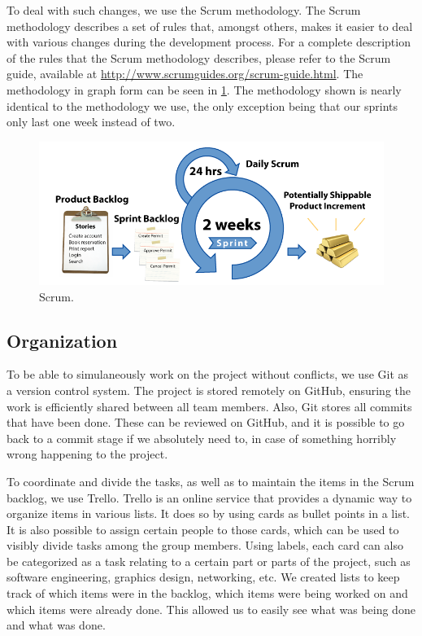 		To deal with such changes, we use the Scrum methodology. The Scrum
		methodology describes a set of rules that, amongst others, makes it
		easier to deal with various changes during the development process.
		For a complete description of the rules that the Scrum methodology
		describes, please refer to the Scrum guide, available at
		\url{http://www.scrumguides.org/scrum-guide.html}. The methodology
		in graph form can be seen in \ref{fig:scrum}. The methodology
		shown is nearly identical to the methodology we use, the only 
		exception being that our sprints only last one week instead of two.
		\begin{figure}
			\centering
			\includegraphics[width=\textwidth]{Scrum}
			\caption{Scrum.}
			\label{fig:scrum}
		\end{figure}

    \subsection{Organization} \label{ssec:organization}
      To be able to simulaneously work on the project without conflicts, we
      use Git as a version control system. The project is stored remotely on
      GitHub, ensuring the work is efficiently shared between all team members.
      Also, Git stores all commits that have been done. These can be reviewed
      on GitHub, and it is possible to go back to a commit stage if we
      absolutely need to, in case of something horribly wrong happening to
      the project.

      To coordinate and divide the tasks, as well as to maintain the items in
      the Scrum backlog, we use Trello. Trello is an online service that
      provides a dynamic way to organize items in various lists. It does
      so by using cards as bullet points in a list. It is also possible to
      assign certain people to those cards, which can be used to visibly
      divide tasks among the group members. Using labels, each card can also
      be categorized as a task relating to a certain part or parts of the
      project, such as software engineering, graphics design, networking,
      etc. We created lists to keep track of which items were in the backlog, 
      which items were being worked on and which items were already done.
      This allowed us to easily see what was being done and what was done.


